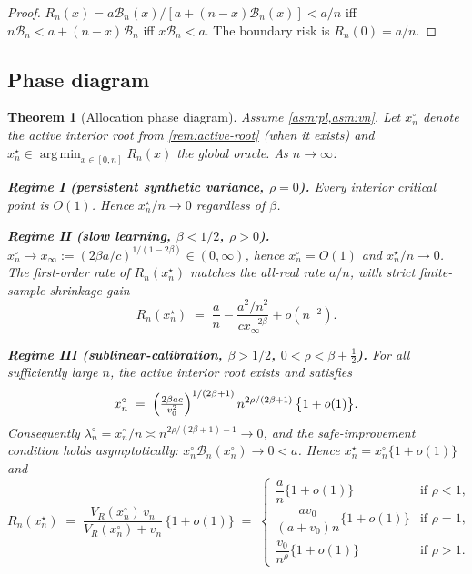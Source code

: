 \documentclass[11pt]{article}
\theoremstyle{plain}
\newtheorem{theorem}{Theorem}[section]
\theoremstyle{definition}
\theoremstyle{remark}
\DeclareMathOperator*{\argmin}{arg\,min}
\begin{document}
\begin{proof}
$R_n(x)=a\mathcal{B}_n(x)/[a+(n-x)\mathcal{B}_n(x)]<a/n$ iff $n\mathcal{B}_n<a+(n-x)\mathcal{B}_n$ iff $x\mathcal{B}_n<a$. The boundary risk is $R_n(0)=a/n$.
\end{proof}

\subsection{Phase diagram}
\label{ssec:phase}

\begin{theorem}[Allocation phase diagram]\label{thm:phase}
Assume \cref{asm:pl,asm:vn}. Let $x_n^\circ$ denote the active interior root from \cref{rem:active-root} (when it exists) and $x_n^\star\in\argmin_{x\in[0,n]}R_n(x)$ the global oracle. As $n\to\infty$:

\smallskip
\noindent\textbf{Regime I (persistent synthetic variance, $\rho=0$).}
Every interior critical point is $O(1)$. Hence $x_n^\star/n\to0$ regardless of $\beta$.

\smallskip
\noindent\textbf{Regime II (slow learning, $\beta<1/2$, $\rho>0$).}
$x_n^\circ\to x_\infty:=(2\beta a/c)^{1/(1-2\beta)}\in(0,\infty)$, hence $x_n^\circ=O(1)$ and $x_n^\star/n\to0$. The first-order rate of $R_n(x_n^\star)$ matches the all-real rate $a/n$, with strict finite-sample shrinkage gain
\begin{equation*}
R_n(x_n^\star)\;=\;\frac{a}{n}-\frac{a^2/n^2}{cx_\infty^{-2\beta}}+o(n^{-2}).
\end{equation*}

\smallskip
\noindent\textbf{Regime III (sublinear-calibration, $\beta>1/2$, $0<\rho<\beta+\tfrac12$).}
For all sufficiently large $n$, the active interior root exists and satisfies
\begin{equation}\label{eq:xn-circ-III}
x_n^\circ\;=\;\Bigl(\tfrac{2\beta ac}{v_0^2}\Bigr)^{1/(2\beta+1)}\,n^{2\rho/(2\beta+1)}\,\bigl\{1+o(1)\bigr\}.
\end{equation}
Consequently $\lambda_n^\circ=x_n^\circ/n\asymp n^{2\rho/(2\beta+1)-1}\to 0$, and the safe-improvement condition holds asymptotically: $x_n^\circ\mathcal{B}_n(x_n^\circ)\to0<a$. Hence $x_n^\star=x_n^\circ\{1+o(1)\}$ and
\begin{equation}\label{eq:Rn-circ-III}
R_n(x_n^\star)\;=\;\frac{V_R(x_n^\circ)\,v_n}{V_R(x_n^\circ)+v_n}\,\bigl\{1+o(1)\bigr\}\;=\;\begin{cases}\dfrac{a}{n}\{1+o(1)\}&\text{if }\rho<1,\\[6pt]\dfrac{av_0}{(a+v_0)n}\{1+o(1)\}&\text{if }\rho=1,\\[6pt]\dfrac{v_0}{n^\rho}\{1+o(1)\}&\text{if }\rho>1.\end{cases}
\end{equation}


\end{theorem}
\end{document}
